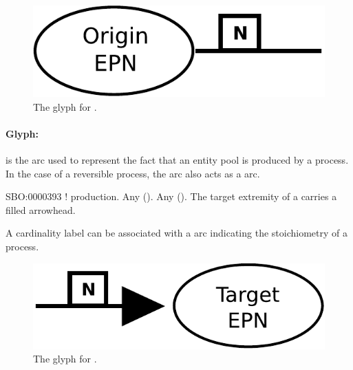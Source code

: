 \begin{figure}[H]
  \centering
  \includegraphics[scale = 0.4]{images/consumption}
  \caption{The \PD glyph for .}
  \label{fig:consumption}
\end{figure}



\paragraph{Glyph: }\label{sec:production}

 is the arc used to represent the fact that an entity pool is 
produced by a process. In the case of a reversible process, the 
 arc also acts as a  arc.

\begin{glyphDescription}
 \glyphSboTerm SBO:0000393 ! production.
 \glyphOrigin Any  ().
 \glyphTarget Any  ().
 \glyphEndPoint The target extremity of a  carries a filled arrowhead.
 \end{glyphDescription}

A cardinality label can be associated with a  arc indicating the stoichiometry of a process.

\begin{figure}[H]
  \centering
  \includegraphics[scale = 0.4]{images/production}
  \caption{The \PD glyph for .}
  \label{fig:production}
\end{figure}


